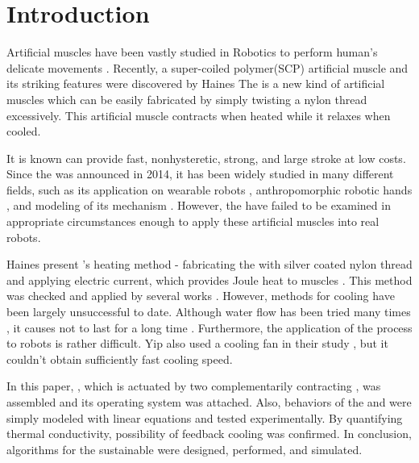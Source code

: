
\section{Introduction}
Artificial muscles have been vastly studied in Robotics to perform human's delicate movements \cite{ashley}. Recently, a super-coiled polymer(SCP) artificial muscle and its striking features were discovered by Haines \etal \cite{haines} The \scp is a new kind of artificial muscles which can be easily fabricated by simply twisting a nylon thread excessively. This artificial muscle contracts when heated while it relaxes when cooled.

It is known \scps can provide fast, nonhysteretic, strong, and large stroke at low costs\cite{yuan, mirvakili, madden}. 
Since the \scp was announced in 2014, it has been widely studied in many different fields, such as its application on
wearable robots \cite{sphincter, kianzad2}, 
anthropomorphic robotic hands \cite{yip, finger}, 
and modeling of its mechanism \cite{treatise, torsional, youngmodulus, fab_coil, multiscale, healing, kianzad, moretti}. 
However, the \scps have failed to be examined in appropriate circumstances enough to apply these artificial muscles into real robots.

Haines \etalspace present \scpnospace's heating method - fabricating the \scps with silver coated nylon thread and applying electric current, which provides Joule heat to muscles \cite{haines}. This method was checked and applied by several works \cite{yip, mirvakili,kianzad,sphincter,kianzad2}. However, methods for cooling \scps have been largely unsuccessful to date. 
Although water flow has been tried many times \cite{haines,finger},
it causes \scps not to last for a long time \cite{haines}.
Furthermore, the application of the process to robots is rather difficult.
Yip \etalspace also used a cooling fan in their study \cite{yip}, but it couldn't obtain sufficiently fast cooling speed.

In this paper, \antanospace, which is actuated by two complementarily contracting \scpsnospace, was assembled and its operating system was attached. Also, behaviors of the \scps and \anta were simply modeled with linear equations and tested experimentally. By quantifying thermal conductivity, possibility of feedback cooling was confirmed. In conclusion, algorithms for the sustainable \apc were designed, performed, and simulated.
